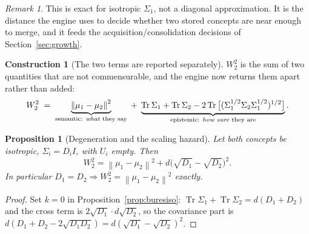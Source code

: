 \documentclass[11pt]{article}
\theoremstyle{definition}
\newtheorem{construction}[definition]{Construction}
\theoremstyle{plain}
\newtheorem{proposition}[definition]{Proposition}
\theoremstyle{remark}
\newtheorem{remark}[definition]{Remark}
\newcommand{\Tr}{\operatorname{Tr}}
\newcommand{\norm}[1]{\left\lVert #1 \right\rVert}
\begin{document}
\begin{remark}
This is exact for isotropic $\Sigma_1$, not a diagonal approximation. It is the
distance the engine uses to decide whether two stored concepts are near enough to
merge, and it feeds the acquisition/consolidation decisions of
Section~\ref{sec:growth}.
\end{remark}

\begin{construction}[The two terms are reported separately]\label{con:w2split}
$W_2^2$ is the sum of two quantities that are not commensurable, and the engine now
returns them apart rather than added:
\begin{equation}\label{eq:w2split}
W_2^2\;=\;\underbrace{\norm{\mu_1-\mu_2}^2}_{\text{semantic: \emph{what} they say}}
\;+\;\underbrace{\Tr\Sigma_1+\Tr\Sigma_2-2\Tr\big[(\Sigma_1^{1/2}\Sigma_2\Sigma_1^{1/2})^{1/2}\big]}_{\text{epistemic: \emph{how sure} they are}} .
\end{equation}
\end{construction}

\begin{proposition}[Degeneration and the scaling hazard]\label{prop:w2hazard}
Let both concepts be isotropic, $\Sigma_i=D_iI$, with $U_i$ empty. Then
\begin{equation}\label{eq:w2iso}
W_2^2=\norm{\mu_1-\mu_2}^2+d\big(\sqrt{D_1}-\sqrt{D_2}\big)^2 .
\end{equation}
In particular $D_1=D_2\Rightarrow W_2^2=\norm{\mu_1-\mu_2}^2$ exactly.
\end{proposition}
\begin{proof}
Set $k=0$ in Proposition~\ref{prop:buresiso}: $\Tr\Sigma_1+\Tr\Sigma_2=d(D_1+D_2)$ and
the cross term is $2\sqrt{D_1}\cdot d\sqrt{D_2}$, so the covariance part is
$d(D_1+D_2-2\sqrt{D_1D_2})=d(\sqrt{D_1}-\sqrt{D_2})^2$.
\end{proof}
\end{document}
